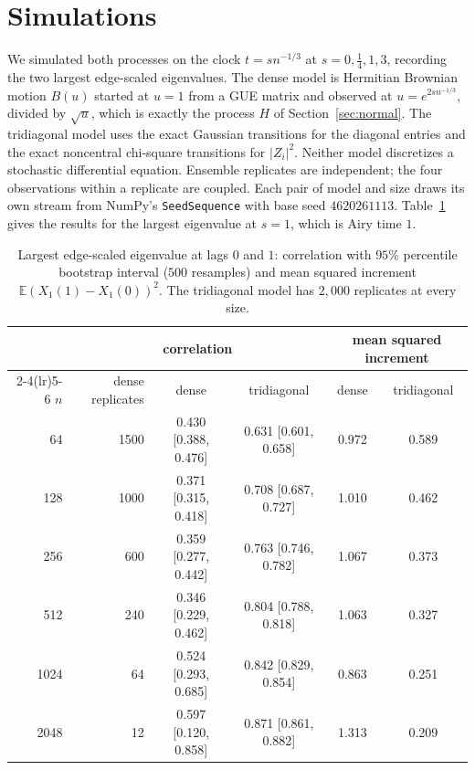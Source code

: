 \documentclass[11pt]{amsart}
\theoremstyle{remark}
\newcommand{\EE}{\mathbb{E}}
\begin{document}
\section{Simulations}\label{sec:sims}

We simulated both processes on the clock $t=sn^{-1/3}$ at $s=0,\frac14,1,3$, recording the two largest edge-scaled
eigenvalues. The dense model is Hermitian Brownian motion $B(u)$ started at $u=1$ from a GUE matrix and observed at
$u=e^{2sn^{-1/3}}$, divided by $\sqrt u$, which is exactly the process $H$ of Section~\ref{sec:normal}. The tridiagonal
model uses the exact Gaussian transitions for the diagonal entries and the exact noncentral chi-square transitions for
$|Z_i|^2$. Neither model discretizes a stochastic differential equation. Ensemble replicates are independent; the four
observations within a replicate are coupled. Each pair of model and size draws its own stream from NumPy's
\texttt{SeedSequence} with base seed $4620261113$. Table~\ref{tab:sims} gives the results for the largest eigenvalue at
$s=1$, which is Airy time $1$.

\begin{table}[ht]
\centering
\caption{Largest edge-scaled eigenvalue at lags $0$ and $1$: correlation with $95\%$ percentile bootstrap interval
($500$ resamples) and mean squared increment $\EE(X_1(1)-X_1(0))^2$. The tridiagonal model has $2{,}000$ replicates at
every size.}\label{tab:sims}
\small
\begin{tabular}{rrcccc}
\toprule
& \multicolumn{3}{c}{correlation} & \multicolumn{2}{c}{mean squared increment}\\
\cmidrule(lr){2-4}\cmidrule(lr){5-6}
$n$ & dense replicates & dense & tridiagonal & dense & tridiagonal\\
\midrule
64 & 1500 & 0.430 [0.388, 0.476] & 0.631 [0.601, 0.658] & 0.972 & 0.589\\
128 & 1000 & 0.371 [0.315, 0.418] & 0.708 [0.687, 0.727] & 1.010 & 0.462\\
256 & 600 & 0.359 [0.277, 0.442] & 0.763 [0.746, 0.782] & 1.067 & 0.373\\
512 & 240 & 0.346 [0.229, 0.462] & 0.804 [0.788, 0.818] & 1.063 & 0.327\\
1024 & 64 & 0.524 [0.293, 0.685] & 0.842 [0.829, 0.854] & 0.863 & 0.251\\
2048 & 12 & 0.597 [0.120, 0.858] & 0.871 [0.861, 0.882] & 1.313 & 0.209\\
\bottomrule
\end{tabular}
\end{table}
\end{document}
